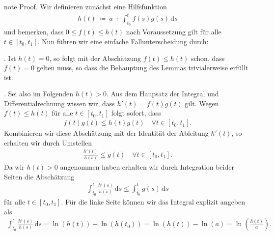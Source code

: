 \documentclass[letterpaper,10pt,english]{jupyterBook}
\begin{document}
\begin{sphinxadmonition}{note}
\sphinxAtStartPar
Proof. Wir definieren zunächst eine Hilfsfunktion
\begin{equation*}
\begin{split}h(t) \ \coloneqq \ a + \int_{t_0}^t f(s)g(s)\, \mathrm{d}s\end{split}
\end{equation*}
\sphinxAtStartPar
und bemerken, dass \(0 \leq f(t) \leq h(t)\) nach Voraussetzung gilt für alle \(t \in [t_0, t_1]\).
Nun führen wir eine einfache Fallunterscheidung durch:

. Ist \(h(t)=0\), so folgt mit der Abschätzung \(f(t) \leq h(t)\) schon, dass \(f(t) = 0\) gelten muss, so dass die Behauptung des Lemmas trivialerweise erfüllt ist.

. Sei also im Folgenden \(h(t) > 0\).
Aus dem Haupsatz der Integral\sphinxhyphen{} und Differentialrechnung wissen wir, dass \(h'(t) = f(t)g(t)\) gilt.
Wegen \(f(t) \leq h(t)\) für alle \(t \in [t_0, t_1]\) folgt sofort, dass
\begin{equation*}
\begin{split}f(t)g(t) \leq h(t)g(t) \quad \forall t \in [t_0,t_1].\end{split}
\end{equation*}
\sphinxAtStartPar
Kombinieren wir diese Abschätzung mit der Identität der Ableitung \(h'(t)\), so erhalten wir durch Umstellen
\begin{equation*}
\begin{split}\frac{h'(t)}{h(t)} \leq g(t) \quad \forall t \in [t_0, t_1].\end{split}
\end{equation*}
\sphinxAtStartPar
Da wir \(h(t) > 0\) angenommen haben erhalten wir durch Integration beider Seiten die Abschätzung
\begin{equation*}
\begin{split}\int_{t_0}^t \frac{h'(s)}{h(s)} \, \mathrm{d}s \leq \int_{t_0}^t g(s) \, \mathrm{d}s \end{split}
\end{equation*}
\sphinxAtStartPar
für alle \(t \in [t_0, t_1]\).
Für die linke Seite können wir das Integral explizit angeben als
\begin{equation*}
\begin{split}\int_{t_0}^t \frac{h'(s)}{h(s)} \, \mathrm{d}s = \ln(h(t)) - \ln(h(t_0)) = \ln(h(t)) - \ln(a) = \ln\left(\frac{h(t)}{a}\right).\end{split}

\end{equation*}
\end{sphinxadmonition}
\end{document}
